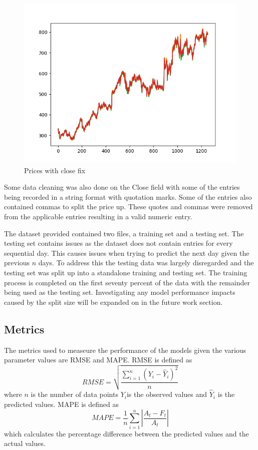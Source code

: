 \documentclass[10pt,twocolumn,letterpaper]{article}
\newcommand{\squeezeup}{\vspace{-10.0mm}}
\begin{document}
\begin{center}
   \begin{figure}[H]
   \includegraphics[scale=0.5]{close_fix.png}
   \caption{Prices with close fix }
   \end{figure}
 \end{center}
 \squeezeup

Some data cleaning was also done on the Close field with some of the entries being 
recorded in a string format with quotation marks. Some of the entries also contained 
commas to split the price up. These quotes and commas were removed from the applicable 
entries resulting in a valid numeric entry.

The dataset provided contained two files, a training set and a testing set. The testing 
set contains issues as the dataset does not contain entries for every sequential day.
This causes issues when trying to predict the next day given the previous $n$ days. 
To address this the testing data was largely disregarded and the testing set was 
split up into a standalone training and testing set. The training process is completed 
on the first seventy percent of the data with the remainder being used as the testing set.
Investigating any model performance impacts caused by the split size will be expanded on 
in the future work section. 
\subsection{Metrics}
The metrics used to measeure the performance of the models given the various parameter 
values are RMSE and MAPE. RMSE is defined as
\begin{equation}
   RMSE = \sqrt{\dfrac{\sum_{i=1}^{n}(Y_i - \hat{Y}_i)^2}{n}}
\end{equation}
where $n$ is the number of data points $Y_i$is the observed values and $\hat{Y}_{i}$
is the predicted values. MAPE is defined as
\begin{equation}
   MAPE = \dfrac{1}{n}\sum_{i=1}^{n}\left\lvert\dfrac{A_t-F_t}{A_t}\right\rvert 
\end{equation}
which calculates the percentage difference between the predicted values and the actual 
values.
\end{document}
